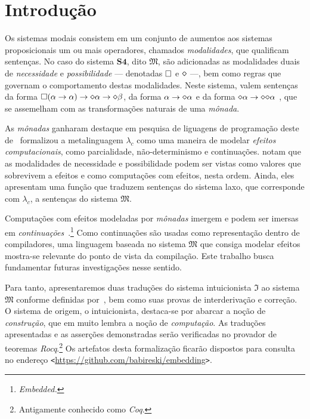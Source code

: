 \chapter{Introdução}

    Os sistemas modais consistem em um conjunto de aumentos aos sistemas proposicionais um ou mais operadores, chamados \emph{modalidades}, que qualificam sentenças.
    No caso do sistema $\mathbf{S4}$, dito $\mathfrak{M}$, são adicionadas as modalidades duais de \emph{necessidade} e \emph{possibilidade} --- denotadas $\Box$ e $\pos$ ---, bem como regras que governam o comportamento destas modalidades.
    Neste sistema, valem sentenças da forma $\nec(\alpha\to\alpha)\to\pos\alpha\to\pos\beta$, da forma $\alpha\to\pos\alpha$ e da forma $\pos\alpha\to\pos\pos\alpha$ \citep{Zach+others.2019}, que se assemelham com as transformações naturais de uma \emph{mônada}.

    \vspace{.5\baselineskip}
    As \emph{mônadas} ganharam destaque em pesquisa de liguagens de programação deste de~\cite{Moggi.1991} formalizou a metalinguagem $\lambda_c$ como uma maneira de modelar \emph{efeitos computacionais}, como parcialidade, não-determinismo e continuações.
    \cite{Pfenning+Davies.2001} notam que as modalidades de necessidade e possibilidade podem ser vistas como valores que sobrevivem a efeitos e como computações com efeitos, nesta ordem.
    Ainda, eles apresentam uma função que traduzem sentenças do sistema laxo, que corresponde com $\lambda_c$, a sentenças do sistema $\mathfrak{M}$.

    \vspace{.5\baselineskip}
    Computações com efeitos modeladas por \emph{mônadas} imergem e podem ser imersas em \emph{continuações}~\citep{Filinski.1994}.\footnote{\emph{Embedded.}}
    Como continuações são usadas como representação dentro de compiladores, uma linguagem baseada no sistema $\mathfrak{M}$ que consiga modelar efeitos mostra-se relevante do ponto de vista da compilação.
    Este trabalho busca fundamentar futuras investigações nesse sentido.

    \vspace{.5\baselineskip}
    Para tanto, apresentaremos duas traduções do sistema intuicionista $\mathfrak{I}$ ao sistema $\mathfrak{M}$ conforme definidas por~\cite{Troelstra+Schwichtenberg.2000}, bem como suas provas de interderivação e correção.
    O sistema de origem, o intuicionista, destaca-se por abarcar a noção de \emph{construção}, que em muito lembra a noção de \emph{computação}.
    As traduções apresentadas e as asserções demonstradas serão verificadas no provador de teoremas \emph{Rocq}.\footnote{Antigamente conhecido como \emph{Coq}.}
    Os artefatos desta formalização ficarão dispostos para consulta no endereço \texttt{<}\url{https://github.com/babireski/embedding}\texttt{>}.

